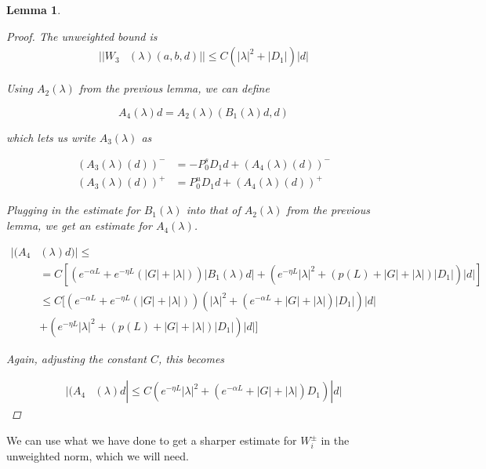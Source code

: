 \documentclass[12pt]{article}
\newtheorem{lemma}{Lemma}
\begin{document}
\begin{lemma}
\begin{proof}
The unweighted bound is
\begin{align*}
||W_3&(\lambda)(a,b,d)|| \leq C \left( |\lambda|^2 + |D_1|\right)|d|
\end{align*} 


Using $A_2(\lambda)$ from the previous lemma, we can define

\[
A_4(\lambda)d = A_2(\lambda)(B_1(\lambda)d,d)
\]

which lets us write $A_3(\lambda)$ as 

\begin{align*}
(A_3(\lambda)(d))^- &= -P_0^s D_1 d + (A_4(\lambda)(d))^-\\
(A_3(\lambda)(d))^+ &= P_0^u D_1 d + (A_4(\lambda)(d))^+
\end{align*}

Plugging in the estimate for $B_1(\lambda)$ into that of $A_2(\lambda)$ from the previous lemma, we get an estimate for $A_4(\lambda)$.

\begin{align*}
|(A_4&(\lambda)d)| \leq \\
&= C \left[ \left( e^{-\alpha L} + e^{-\eta L} \left(|G| + |\lambda|\right)\right) |B_1(\lambda)d|
+ \left( e^{-\eta L} |\lambda|^2 + \left( p(L) + |G| + |\lambda| \right)|D_1| \right)|d| \right]\\
&\leq C [ \left( e^{-\alpha L} + e^{-\eta L} \left(|G| + |\lambda|\right)\right) (|\lambda|^2 + (e^{-\alpha L} + |G| + |\lambda|)|D_1| )|d|\\
&+ \left( e^{-\eta L} |\lambda|^2 + \left( p(L) + |G| + |\lambda| \right)|D_1| \right)|d| ]
\end{align*}

Again, adjusting the constant $C$, this becomes

\begin{align*}
|(A_4&(\lambda)d| \leq C ( e^{-\eta L}|\lambda|^2 + (e^{-\alpha L} + |G| + |\lambda|)D_1)|d|
\end{align*}

\end{proof}
\end{lemma}

We can use what we have done to get a sharper estimate for $W_i^\pm$ in the unweighted norm, which we will need.
\end{document}
